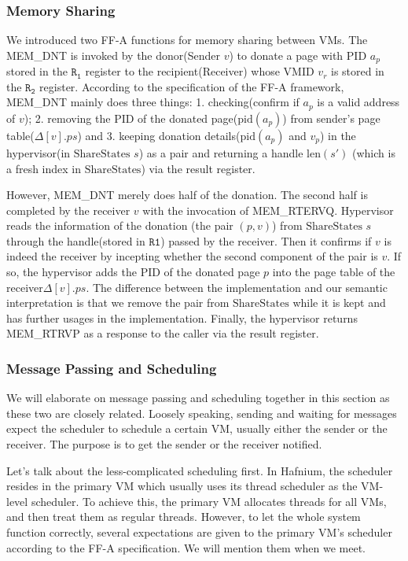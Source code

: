\documentclass[a4paper]{article}
\newcommand*{\SSS}{\text{ShareStates}}
\newcommand*{\PID}{\text{PID}}
\newcommand*{\VMID}{\text{VMID}}
\begin{document}
\subsubsection{Memory Sharing}
We introduced two FF-A functions for memory sharing between VMs. The MEM\_DNT is
invoked by the donor(Sender $v$) to donate a page with $\PID$ $a_{p}$ stored in
the $\mathtt{R_{1}}$ register to the recipient(Receiver) whose $\VMID$ $v_{r}$
is stored in the $\mathtt{R_{2}}$ register. According to the specification of
the FF-A framework, MEM\_DNT mainly does three things: 1. checking(confirm if
$a_{p}$ is a valid address of $v$); 2. removing the $\PID$ of the donated
page($\text{pid}(a_{p})$) from sender's page table($\Delta[v].ps$) and 3.
keeping donation details($\text{pid}(a_{p})$ and $v_{p}$) in the hypervisor(in
$\SSS$ $s$) as a pair and returning a handle $\text{len}(s')$ (which is a fresh index
in $\SSS$) via the result register.

However, MEM\_DNT merely does half of the donation. The second half is completed
by the receiver $v$ with the invocation of MEM\_RTERVQ. Hypervisor reads the
information of the donation (the pair $(p,v)$) from $\SSS$ $s$ through the
handle(stored in $\mathtt{R1}$) passed by the receiver. Then it confirms if $v$ is
indeed the receiver by incepting whether the second component of the pair is
$v$. If so, the hypervisor adds the $\PID$ of the donated page $p$ into the page
table of the receiver$\Delta[v].ps$. The difference between the implementation
and our semantic interpretation is that we remove the pair from $\SSS$ while it
is kept and has further usages in the implementation. Finally, the hypervisor
returns MEM\_RTRVP as a response to the caller via the result register.


\subsubsection{Message Passing and Scheduling}
We will elaborate on message passing and scheduling together in this section as
these two are closely related. Loosely speaking, sending and waiting for
messages expect the scheduler to schedule a certain VM, usually either the
sender or the receiver. The purpose is to get the sender or the
receiver notified.

Let's talk about the less-complicated scheduling first. In Hafnium, the
scheduler resides in the primary VM which usually uses its thread scheduler as
the VM-level scheduler. To achieve this, the primary VM allocates threads for all
VMs, and then treat them as regular threads. However, to let the whole system
function correctly, several expectations are given to the primary VM's scheduler
according to the FF-A specification. We will mention them when we meet.
\end{document}
